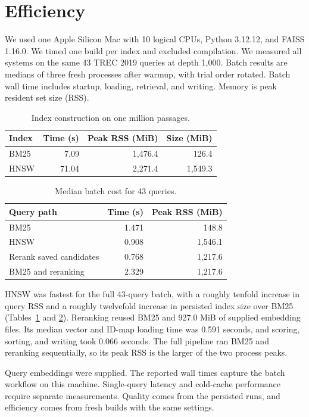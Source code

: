 \documentclass[11pt,letterpaper]{article}
\begin{document}
\newpage
\section{Efficiency}
We used one Apple Silicon Mac with 10 logical CPUs, Python 3.12.12, and FAISS 1.16.0. We timed one build per index and excluded compilation. We measured all systems on the same 43 TREC 2019 queries at depth 1,000. Batch results are medians of three fresh processes after warmup, with trial order rotated. Batch wall time includes startup, loading, retrieval, and writing. Memory is peak resident set size (RSS).

\begin{table}[H]
\centering\small
\caption{Index construction on one million passages.}
\label{tab:build}
\begin{tabular}{@{}lrrr@{}}
\toprule
Index & Time (s) & Peak RSS (MiB) & Size (MiB)\\
\midrule
BM25 & 7.09 & 1,476.4 & 126.4\\
HNSW & 71.04 & 2,271.4 & 1,549.3\\
\bottomrule
\end{tabular}
\end{table}

\begin{table}[H]
\centering\small
\caption{Median batch cost for 43 queries.}
\label{tab:batch}
\begin{tabular}{@{}lrr@{}}
\toprule
Query path & Time (s) & Peak RSS (MiB)\\
\midrule
BM25 & 1.471 & 148.8\\
HNSW & 0.908 & 1,546.1\\
Rerank saved candidates & 0.768 & 1,217.6\\
BM25 and reranking & 2.329 & 1,217.6\\
\bottomrule
\end{tabular}
\end{table}

HNSW was fastest for the full 43-query batch, with a roughly tenfold increase in query RSS and a roughly twelvefold increase in persisted index size over BM25 (Tables~\ref{tab:build} and \ref{tab:batch}). Reranking reused BM25 and 927.0 MiB of supplied embedding files. Its median vector and ID-map loading time was 0.591 seconds, and scoring, sorting, and writing took 0.066 seconds. The full pipeline ran BM25 and reranking sequentially, so its peak RSS is the larger of the two process peaks.

Query embeddings were supplied. The reported wall times capture the batch workflow on this machine. Single-query latency and cold-cache performance require separate measurements. Quality comes from the persisted runs, and efficiency comes from fresh builds with the same settings.
\end{document}
